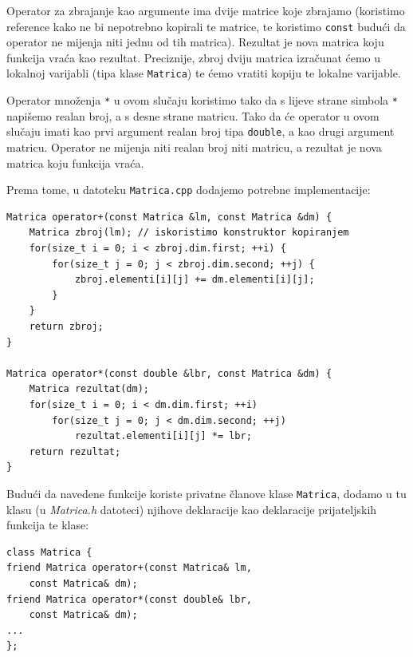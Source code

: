 \begin{rjesenje}
    Operator za zbrajanje kao argumente ima dvije matrice koje zbrajamo
    (koristimo reference kako ne bi nepotrebno kopirali te matrice,
    te koristimo \texttt{const} budući da operator ne mijenja niti jednu od tih matrica).
    Rezultat je nova matrica koju funkcija vraća kao rezultat.
    Preciznije, zbroj dviju matrica izračunat ćemo u lokalnoj varijabli (tipa klase \texttt{Matrica}) te ćemo vratiti kopiju te lokalne varijable.
    \medskip

    Operator množenja \texttt{*} u ovom slučaju koristimo tako da s lijeve strane simbola \texttt{*} napišemo realan broj, a 
    s desne strane matricu.
    Tako da će operator u ovom slučaju imati kao prvi argument realan broj tipa \texttt{double}, a kao drugi argument matricu.
    Operator ne mijenja niti realan broj niti matricu,
    a rezultat je nova matrica koju funkcija vraća.
    \medskip

    Prema tome, u datoteku \texttt{Matrica.cpp} dodajemo 
    potrebne implementacije:
    \begin{verbatim}
Matrica operator+(const Matrica &lm, const Matrica &dm) {
    Matrica zbroj(lm); // iskoristimo konstruktor kopiranjem
    for(size_t i = 0; i < zbroj.dim.first; ++i) {
        for(size_t j = 0; j < zbroj.dim.second; ++j) {
            zbroj.elementi[i][j] += dm.elementi[i][j];
        }
    }
    return zbroj;
}

Matrica operator*(const double &lbr, const Matrica &dm) {
    Matrica rezultat(dm);
    for(size_t i = 0; i < dm.dim.first; ++i)
        for(size_t j = 0; j < dm.dim.second; ++j)
            rezultat.elementi[i][j] *= lbr;
    return rezultat;
}
    \end{verbatim}

Budući da navedene funkcije koriste privatne članove klase \texttt{Matrica},
dodamo u tu klasu (u \textit{Matrica.h} datoteci)
njihove deklaracije kao deklaracije prijateljskih funkcija te klase:

\begin{verbatim}
class Matrica {
friend Matrica operator+(const Matrica& lm, 
    const Matrica& dm);
friend Matrica operator*(const double& lbr, 
    const Matrica& dm);
...
};
\end{verbatim}
\end{rjesenje}


